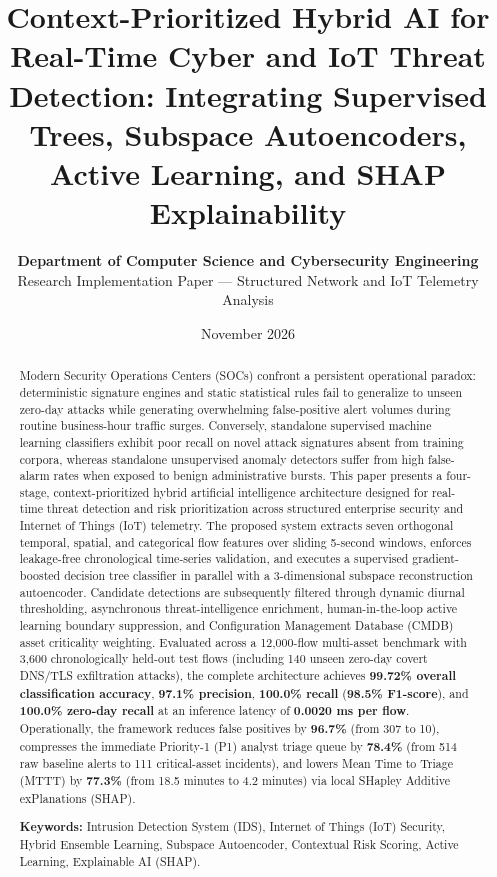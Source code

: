 \documentclass[10pt,a4paper]{article}
\title{\vspace{-10mm}\textbf{\Large Context-Prioritized Hybrid AI for Real-Time Cyber and IoT Threat Detection: Integrating Supervised Trees, Subspace Autoencoders, Active Learning, and SHAP Explainability}}
\author{\textbf{Department of Computer Science and Cybersecurity Engineering}\\
\small Research Implementation Paper --- Structured Network and IoT Telemetry Analysis}
\date{\small November 2026}
\begin{document}
\maketitle
\thispagestyle{fancy}

\begin{abstract}
\noindent Modern Security Operations Centers (SOCs) confront a persistent operational paradox: deterministic signature engines and static statistical rules fail to generalize to unseen zero-day attacks while generating overwhelming false-positive alert volumes during routine business-hour traffic surges. Conversely, standalone supervised machine learning classifiers exhibit poor recall on novel attack signatures absent from training corpora, whereas standalone unsupervised anomaly detectors suffer from high false-alarm rates when exposed to benign administrative bursts. This paper presents a four-stage, context-prioritized hybrid artificial intelligence architecture designed for real-time threat detection and risk prioritization across structured enterprise security and Internet of Things (IoT) telemetry. The proposed system extracts seven orthogonal temporal, spatial, and categorical flow features over sliding 5-second windows, enforces leakage-free chronological time-series validation, and executes a supervised gradient-boosted decision tree classifier in parallel with a 3-dimensional subspace reconstruction autoencoder. Candidate detections are subsequently filtered through dynamic diurnal thresholding, asynchronous threat-intelligence enrichment, human-in-the-loop active learning boundary suppression, and Configuration Management Database (CMDB) asset criticality weighting. Evaluated across a 12,000-flow multi-asset benchmark with 3,600 chronologically held-out test flows (including 140 unseen zero-day covert DNS/TLS exfiltration attacks), the complete architecture achieves \textbf{99.72\% overall classification accuracy}, \textbf{97.1\% precision}, \textbf{100.0\% recall} (\textbf{98.5\% F1-score}), and \textbf{100.0\% zero-day recall} at an inference latency of \textbf{0.0020 ms per flow}. Operationally, the framework reduces false positives by \textbf{96.7\%} (from 307 to 10), compresses the immediate Priority-1 (P1) analyst triage queue by \textbf{78.4\%} (from 514 raw baseline alerts to 111 critical-asset incidents), and lowers Mean Time to Triage (MTTT) by \textbf{77.3\%} (from 18.5 minutes to 4.2 minutes) via local SHapley Additive exPlanations (SHAP).

\vspace{4pt}
\noindent\textbf{Keywords:} Intrusion Detection System (IDS), Internet of Things (IoT) Security, Hybrid Ensemble Learning, Subspace Autoencoder, Contextual Risk Scoring, Active Learning, Explainable AI (SHAP).
\end{abstract}
\end{document}
